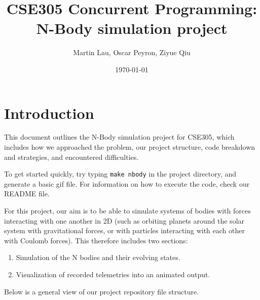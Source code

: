 \documentclass{article}
\title{CSE305 Concurrent Programming: N-Body simulation project}
\author{Martin Lau, Oscar Peyron, Ziyue Qiu}
\date{\today}
\begin{document}
\maketitle

\section{Introduction}
This document outlines the N-Body simulation project for CSE305, which includes how we approached the problem, our project structure, code breakdown and strategies, and encountered difficulties.

To get started quickly, try typing \texttt{make nbody} in the project directory, and generate a basic gif file.
For information on how to execute the code, check our README file.

For this project, our aim is to be able to simulate systems of bodies with forces interacting with one another in 2D (such as orbiting planets around the solar system with gravitational forces, or with particles interacting with each other with Coulomb forces). This therefore includes two sections:
\begin{enumerate}
    \item Simulation of the N bodies and their evolving states.
    \item Visualization of recorded telemetries into an animated output.
\end{enumerate}

Below is a general view of our project repository file structure. 

\begin{tcolorbox}[title=Project directory summary]

\end{tcolorbox}
\end{document}
